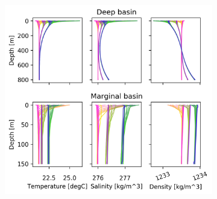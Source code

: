 \documentclass[twocolumn]{article}
\begin{document}
\begin{figure}
\centering
\begin{subfigure}[h]{0.70\textwidth}
\centering
\includegraphics[width=\linewidth,keepaspectratio]{001_net_evap_40yr_3steps_V2.png}
\end{subfigure}\hfill
\begin{subfigure}[h]{0.20\textwidth}
\centering

\end{subfigure}
\end{figure}
\end{document}

